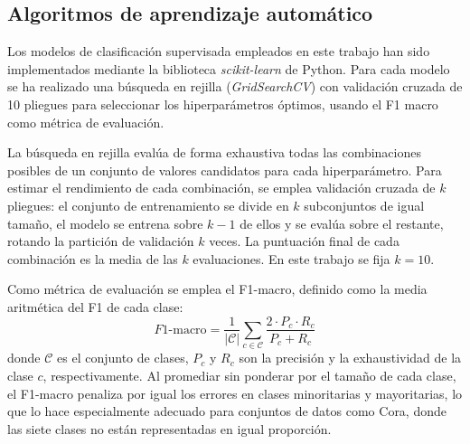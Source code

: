 \documentclass[conference,a4paper]{IEEEtran}
\begin{document}
\subsection{Algoritmos de aprendizaje automático}

Los modelos de clasificación supervisada empleados en este trabajo 
han sido implementados mediante la biblioteca \emph{scikit-learn} 
de Python. Para cada modelo se ha realizado una búsqueda en rejilla 
(\emph{GridSearchCV}) con validación cruzada de 10 pliegues para 
seleccionar los hiperparámetros óptimos, usando el F1 macro como 
métrica de evaluación.

La búsqueda en rejilla evalúa de forma exhaustiva todas las 
combinaciones posibles de un conjunto de valores candidatos para 
cada hiperparámetro. Para estimar el rendimiento de cada combinación, se emplea validación cruzada de $k$ pliegues: el 
conjunto de entrenamiento se divide en $k$ subconjuntos de igual 
tamaño, el modelo se entrena sobre $k-1$ de ellos y se evalúa sobre 
el restante, rotando la partición de validación $k$ veces. La 
puntuación final de cada combinación es la media de las $k$ 
evaluaciones. En este trabajo se fija $k = 10$.

Como métrica de evaluación se emplea el F1-macro, definido como la 
media aritmética del F1 de cada clase:
\begin{equation}
  \label{eq:f1macro}
  F1\text{-macro} = \frac{1}{|\mathcal{C}|} \sum_{c \in \mathcal{C}} 
  \frac{2 \cdot P_c \cdot R_c}{P_c + R_c}
\end{equation}
donde $\mathcal{C}$ es el conjunto de clases, $P_c$ y $R_c$ son la 
precisión y la exhaustividad de la clase $c$, 
respectivamente. Al promediar sin ponderar por el tamaño de cada 
clase, el F1-macro penaliza por igual los errores en clases 
minoritarias y mayoritarias, lo que lo hace especialmente adecuado 
para conjuntos de datos como Cora, donde las siete 
clases no están representadas en igual proporción.
\end{document}
